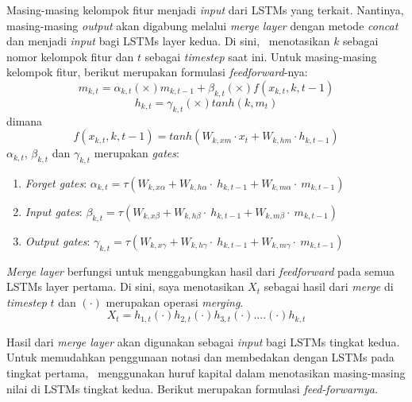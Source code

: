 \begin{enumerate}
	Masing-masing kelompok fitur menjadi \textit{input} dari LSTMs yang terkait. Nantinya, masing-masing \textit{output} akan digabung melalui \textit{merge layer} dengan metode \textit{concat} dan menjadi \textit{input} bagi LSTMs layer kedua.
	Di sini, \saya~menotasikan $ k $ sebagai nomor kelompok fitur dan $ t $ sebagai \textit{timestep} saat ini. Untuk masing-masing kelompok fitur, berikut merupakan formulasi \textit{feedforward}-nya:
	\begin{equation}\label{eq:mt2}
	m_{k,t}=\alpha_{k,t} (\times) m_{k,t-1} + \beta_{k,t} (\times) f(x_{k,t},{k,t-1})
	\end{equation}
	\begin{equation}\label{eq:ht2}
	h_{k,t}=\gamma_{k,t} (\times) tanh(k,m_{t})
	\end{equation}
	dimana
	\begin{equation}\label{eq:hf2}
	f(x_{k,t},{k,t-1})=tanh(W_{k,xm} \cdot x_{t} + W_{k,hm} \cdot h_{k,t-1})
	\end{equation}
	$ \alpha_{k,t} $, $ \beta_{k,t} $ dan $ \gamma_{k,t} $ merupakan \textit{gates}:
	\begin{enumerate}
	\item \textit{Forget gates}: $ \alpha_{k,t}=\tau(W_{k,x\alpha}+W_{k,h\alpha}\cdot~h_{k,t-1}+W_{k,m\alpha}\cdot~m_{k,t-1}) $
	\item \textit{Input gates}: $ \beta_{k,t}=\tau(W_{k,x\beta}+W_{k,h\beta}\cdot~h_{k,t-1}+W_{k,m\beta}\cdot~m_{k,t-1}) $
	\item \textit{Output gates}: $ \gamma_{k,t}=\tau(W_{k,x\gamma}+W_{k,h\gamma}\cdot~h_{k,t-1}+W_{k,m\gamma}\cdot~m_{k,t-1}) $
	\end{enumerate}

	\textit{Merge layer} berfungsi untuk menggabungkan hasil dari \textit{feedforward} pada semua LSTMs layer pertama. Di sini, saya menotasikan $ X_t $ sebagai hasil dari \textit{merge} di \textit{timestep} $ t $ dan $ (\cdot) $ merupakan operasi \textit{merging}.
	\begin{equation}\label{eq:merge}
	X_t = h_{1,t} (\cdot) h_{2,t} (\cdot) h_{3,t} (\cdot) .... (\cdot) h_{k,t}
	\end{equation}

	Hasil dari \textit{merge layer} akan digunakan sebagai \textit{input} bagi LSTMs tingkat kedua. Untuk memudahkan penggunaan notasi dan membedakan dengan LSTMs pada tingkat pertama, \saya~menggunakan huruf kapital dalam menotasikan masing-masing nilai di LSTMs tingkat kedua. Berikut merupakan formulasi \textit{feed-forwarnya}.
	

\end{enumerate}
